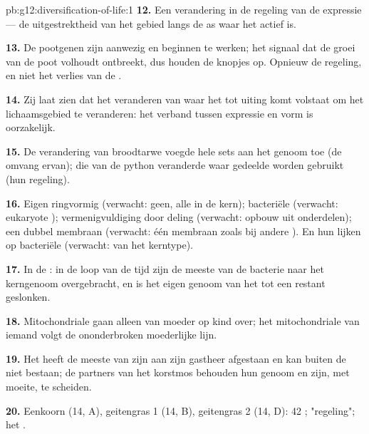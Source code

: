 \begin{solution}{pb:g12:diversification-of-life:1}
\textbf{12.} Een verandering in de regeling van de expressie --- de
uitgestrektheid van het gebied langs de as waar het  actief is.

\textbf{13.} De pootgenen zijn aanwezig en beginnen te werken; het signaal
dat de groei van de poot volhoudt ontbreekt, dus houden de knopjes op.
Opnieuw de regeling, en niet het verlies van de .

\textbf{14.} Zij laat zien dat het veranderen van waar het  tot uiting
komt volstaat om het lichaamsgebied te veranderen: het verband tussen
expressie en vorm is oorzakelijk.

\textbf{15.} De verandering van broodtarwe voegde hele sets aan het genoom
toe (de omvang ervan); die van de python veranderde waar gedeelde 
worden gebruikt (hun regeling).

\textbf{16.} Eigen ringvormig  (verwacht: geen, alle  in de kern);
bacteriële  (verwacht: eukaryote ); vermenigvuldiging
door deling (verwacht: opbouw uit onderdelen); een dubbel membraan
(verwacht: één membraan zoals bij andere ). En hun  lijken
op bacteriële  (verwacht:  van het kerntype).

\textbf{17.} In de : in de loop van de tijd zijn de meeste 
van de bacterie naar het kerngenoom overgebracht, en is het eigen genoom
van het  tot een restant geslonken.

\textbf{18.} Mitochondriale  gaan alleen van moeder op kind over; het
mitochondriale  van iemand volgt de ononderbroken moederlijke lijn.

\textbf{19.} Het  heeft de meeste van zijn  aan zijn
gastheer afgestaan en kan buiten de  niet bestaan; de partners van het
korstmos behouden hun genoom en zijn, met moeite, te scheiden.

\textbf{20.} Eenkoorn (14, A), geitengras 1 (14, B), geitengras 2 (14, D):
42 ; "regeling"; het .
\end{solution}
